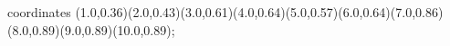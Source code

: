 					coordinates { (1.0,0.36)(2.0,0.43)(3.0,0.61)(4.0,0.64)(5.0,0.57)(6.0,0.64)(7.0,0.86)(8.0,0.89)(9.0,0.89)(10.0,0.89)};